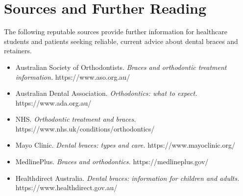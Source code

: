\section*{Sources and Further Reading}
The following reputable sources provide further information for healthcare students and patients seeking reliable, current advice about dental braces and retainers.

\begin{itemize}
    \item Australian Society of Orthodontists. \textit{Braces and orthodontic treatment information.} https://www.aso.org.au/
    \item Australian Dental Association. \textit{Orthodontics: what to expect.} https://www.ada.org.au/
    \item NHS. \textit{Orthodontic treatment and braces.} https://www.nhs.uk/conditions/orthodontics/
    \item Mayo Clinic. \textit{Dental braces: types and care.} https://www.mayoclinic.org/
    \item MedlinePlus. \textit{Braces and orthodontics.} https://medlineplus.gov/
    \item Healthdirect Australia. \textit{Dental braces: information for children and adults.} https://www.healthdirect.gov.au/
\end{itemize}
